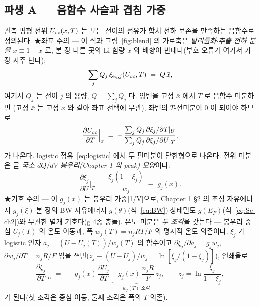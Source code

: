 \subsection{파생 A --- 음함수 사슬과 겹침 가중}\label{ssec:overlap}
관측 평형 전위 $U_{\mathrm{oc}}(x,T)$ 는 모든 전이의 점유가 합쳐 전하 보존을 만족하는 음함수로 정의된다. ★좌표 주의
--- 이 식과 그림~\ref{fig:blend} 의 가로축은 \emph{탈리튬화$\cdot$추출 전하 분율} $\bar x\equiv1-x$ 로, 본 장
다른 곳의 Li 함량 $x$ 와 배향이 반대다(부호 오류가 여기서 가장 자주 난다):
\begin{equation}
\sum_j Q_j\,\xi_{\mathrm{eq},j}(U_{\mathrm{oc}},T) \;=\; Q\,\bar x,
\label{eq:implicit}
\end{equation}
여기서 $Q_j$ 는 전이 $j$ 의 용량, $Q=\sum_j Q_j$ 다. 양변을 고정 $\bar x$ 에서 $T$ 로 음함수 미분하면
(고정 $\bar x$ 는 고정 $x$ 와 같아 좌표 선택에 무관), 좌변의 $T$-전미분이 $0$ 이 되어야 하므로
\begin{equation}
\frac{\partial U_{\mathrm{oc}}}{\partial T}\Big|_x
\;=\; -\,\frac{\sum_j Q_j\,\partial\xi_j/\partial T|_U}{\sum_j Q_j\,\partial\xi_j/\partial U|_T},
\label{eq:implicit_diff}
\end{equation}
가 나온다. logistic 점유~\eqref{eq:logistic} 에서 두 편미분이 닫힌형으로 나온다. 전위 미분은 곧 \emph{국소
$dQ/dV$ 봉우리(Chapter 1 의 peak) 모양}이다:
\begin{equation}
\frac{\partial\xi_j}{\partial U}\Big|_T \;=\; \frac{\xi_j(1-\xi_j)}{w_j} \;\equiv\; g_j(x).
\label{eq:gj}
\end{equation}
★기호 주의 --- 이 $g_j(x)$ 는 봉우리 가중[1/V]으로, Chapter 1 §2 의 조성 자유에너지 $g_j(\xi)$$\cdot$본 장의
BW 자유에너지 $g(\theta)$(식~\eqref{eq:BW})$\cdot$상태밀도 $g(E_F)$(식~\eqref{eq:Se-ch2})와 무관한 별개
기호다(g 4종 충돌). 온도 미분은 \emph{두 조각}을 갖는다 --- 봉우리 중심 $U_j(T)$ 의 온도 이동과,
폭 $w_j(T)=n_jRT/F$ 의 명시적 온도 의존이다. $\xi_j$ 가 logistic 인자 $a_j=(U-U_j(T))/w_j(T)$ 의 함수이고
$\partial\xi_j/\partial a_j=g_j w_j$, $\partial w_j/\partial T=n_jR/F$ 임을 쓰면($z_j\equiv(U-U_j)/w_j=\ln[\xi_j/
(1-\xi_j)]$), 연쇄율로
\begin{equation}
\frac{\partial\xi_j}{\partial T}\Big|_U
\;=\; -\,g_j(x)\,\frac{\partial U_j}{\partial T}
\;\underbrace{-\,g_j(x)\,\frac{n_jR}{F}\,z_j}_{w_j(T)\text{ 조각}},
\qquad z_j=\ln\frac{\xi_j}{1-\xi_j},
\label{eq:dxidT}
\end{equation}
가 된다(첫 조각은 중심 이동, 둘째 조각은 폭의 $T$-의존).

